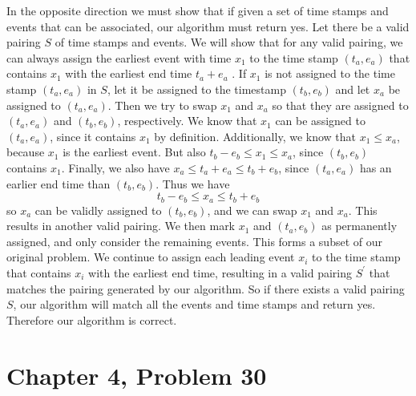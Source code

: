\documentclass[12pt]{article}
\begin{document}
In the opposite direction we must show that if given a set of time stamps and events that can be associated,
our algorithm must return yes. Let there be a valid pairing \(S\) of time stamps and events. We will show that for
any valid pairing, we can always assign the earliest event with time \(x_1\) to the time stamp \((t_a,e_a)\) that contains \(x_1\)
with the earliest end time \(t_a+e_a\) . If \(x_1\) is not assigned to the time stamp \((t_a,e_a)\) in \(S\),
let it be assigned to the timestamp \((t_b,e_b)\) and let \(x_a\) be assigned to \((t_a,e_a)\). Then we try to swap
\(x_1\) and \(x_a\) so that they are assigned to \((t_a,e_a)\) and \((t_b,e_b)\), respectively. We know that \(x_1\) can be
assigned to \((t_a,e_a)\), since it contains \(x_1\) by definition. Additionally, we know that \(x_1\leq x_a\), because \(x_1\)
is the earliest event. But also \(t_b-e_b\leq x_1\leq x_a\), since \((t_b,e_b)\) contains \(x_1\). Finally, we also have
\(x_a\leq t_a+e_a\leq t_b+e_b\), since \((t_a,e_a)\) has an earlier end time than \((t_b,e_b)\). Thus we have
\[t_b-e_b\leq x_a\leq t_b+e_b\]
so \(x_a\) can be validly assigned to \((t_b,e_b)\), and we can swap \(x_1\) and \(x_a\). This results in another
valid pairing. We then mark \(x_1\) and \((t_a,e_b)\) as permanently assigned, and only consider the remaining events. This forms
a subset of our original problem. We continue to assign each leading event \(x_i\) to the time stamp that contains \(x_i\)
with the earliest end time, resulting in a valid pairing \(S^\prime\) that matches the pairing generated by our algorithm. So
if there exists a valid pairing \(S\), our algorithm will match all the events and time stamps and return yes. Therefore our
algorithm is correct.

\pagebreak

\section*{Chapter 4, Problem 30}
\end{document}
